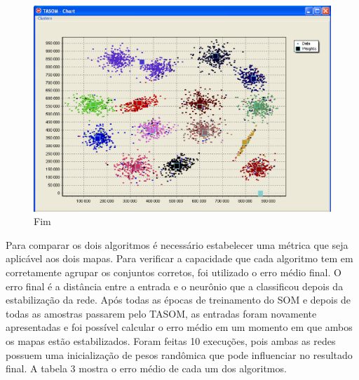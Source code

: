 \begin{figure}[!h]
\centering
\includegraphics[keepaspectratio=true,scale=0.5]
{figuras/tasom3.eps}
\caption{Fim}
\label{data_titatic}
\end{figure}  

Para comparar os dois algoritmos é necessário estabelecer uma métrica que seja aplicável aos dois mapas. Para verificar a capacidade que cada algoritmo tem em corretamente agrupar os conjuntos corretos, foi utilizado o erro médio final. O erro final é a distância entre a entrada e o neurônio que a classificou depois da estabilização da rede. Após todas as épocas de treinamento do SOM e depois de todas as amostras passarem pelo TASOM, as entradas foram novamente apresentadas e foi possível calcular o erro médio em um momento em que ambos os mapas estão estabilizados. Foram feitas 10 execuções, pois ambas as redes possuem uma inicialização de pesos randômica que pode influenciar no resultado final. A tabela 3 mostra o erro médio de cada um dos algoritmos.

